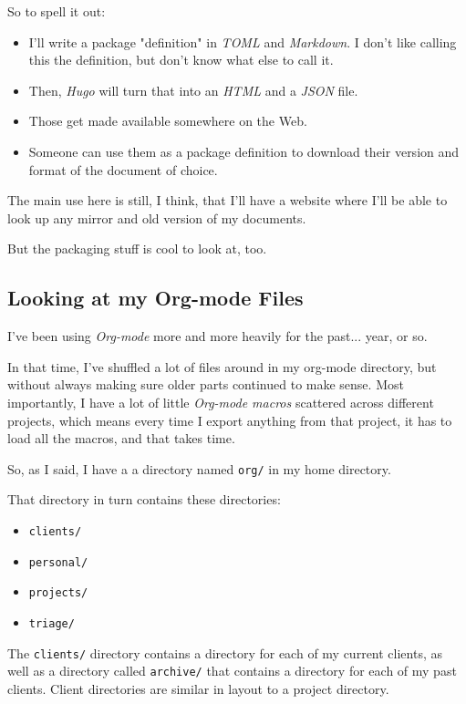 \documentclass[11pt]{article}
\begin{document}
So to spell it out:

\begin{itemize}
\item I'll write a package "definition" in \emph{TOML} and \emph{Markdown}. I don't
like calling this the definition, but don't know what else to call
it.
\item Then, \emph{Hugo} will turn that into an \emph{HTML} and a \emph{JSON} file.
\item Those get made available somewhere on the Web.
\item Someone can use them as a package definition to download their
version and format of the document of choice.
\end{itemize}

The main use here is still, I think, that I'll have a website where
I'll be able to look up any mirror and old version of my documents.

But the packaging stuff is cool to look at, too.
\subsection*{Looking at my Org-mode Files}
\label{sec:org5e8f171}
I've been using \emph{Org-mode} more and more heavily for the past... year,
or so.

In that time, I've shuffled a lot of files around in my org-mode
directory, but without always making sure older parts continued to
make sense. Most importantly, I have a lot of little \emph{Org-mode macros}
scattered across different projects, which means every time I export
anything from that project, it has to load all the macros, and that
takes time.

So, as I said, I have a a directory named \texttt{org/} in my home directory.

That directory in turn contains these directories:
\begin{itemize}
\item \texttt{clients/}
\item \texttt{personal/}
\item \texttt{projects/}
\item \texttt{triage/}
\end{itemize}

The \texttt{clients/} directory contains a directory for each of my current
clients, as well as a directory called \texttt{archive/} that contains a
directory for each of my past clients. Client directories are similar
in layout to a project directory.
\end{document}
